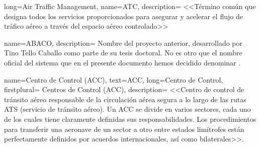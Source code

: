 \makeglossaries

%
%
%        
%

%
%
%        
%



{
    long={Air Traffic Management}, %
    name={ATC}, 
    description=
    {
       <<Término común que designa todos los servicios proporcionados para asegurar y acelerar el flujo de tráfico 
       aéreo a través del espacio aéreo controlado>>~\cite{ENAIRE-web}
    }
}

{
    name={ABACO},
    description=
    {   
        Nombre del proyecto anterior, desarrollado por Tino Tello Caballo como parte de su tesis doctoral. 
        No es otro que el nombre oficial del sistema que en el presente documento hemos decidido denominar \legacy{}.
    }
}

{
    name={Centro de Control (ACC)},
    text={ACC},
	long={Centro de Control}, %
	firstplural= {Centros de Control (ACC)},
    description=
    {
        <<Centro de control de tránsito aéreo responsable de la circulación aérea segura a lo largo de las rutas ATS 
        (servicio de tránsito aéreo). Un ACC se divide en varios sectores, cada uno de los cuales tiene claramente 
        definidas sus responsabilidades. Los procedimientos para transferir una aeronave de un sector a otro entre 
        estados limítrofes están perfectamente definidos por acuerdos internacionales, así como 
        bilaterales>>. \cite{ENAIRE-web}
    }
}

